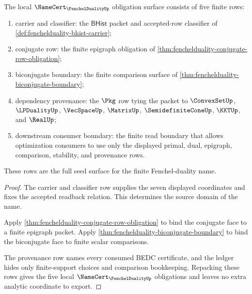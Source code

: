 \begin{theorem}
\label{thm:fenchelduality-certificate-obligation-surface}
The local $\NameCert_{\FenchelDualityUp}$ obligation surface consists of five finite rows:
\begin{enumerate}
\item carrier and classifier: the $\mathsf{BHist}$ packet and accepted-row classifier of \autoref{def:fenchelduality-bhist-carrier};
\item conjugate row: the finite epigraph obligation of \autoref{thm:fenchelduality-conjugate-row-obligation};
\item biconjugate boundary: the finite comparison surface of \autoref{thm:fenchelduality-biconjugate-boundary};
\item dependency provenance: the $\Pkg$ row tying the packet to $\ConvexSetUp$, $\LPDualityUp$, $\VecSpaceUp$, $\MatrixUp$, $\SemidefiniteConeUp$, $\KKTUp$, and $\RealUp$;
\item downstream consumer boundary: the finite read boundary that allows optimization consumers to use only the displayed primal, dual, epigraph, comparison, stability, and provenance rows.
\end{enumerate}
These rows are the full seed surface for the finite Fenchel-duality name.
\end{theorem}
\begin{proof}
The carrier and classifier row supplies the seven displayed coordinates and fixes the accepted readback relation. This determines the source domain of the name.

Apply \autoref{thm:fenchelduality-conjugate-row-obligation} to bind the conjugate face to a finite epigraph packet. Apply \autoref{thm:fenchelduality-biconjugate-boundary} to bind the biconjugate face to finite scalar comparisons.

The provenance row names every consumed BEDC certificate, and the ledger hides only finite-support choices and comparison bookkeeping. Repacking these rows gives the five local $\NameCert_{\FenchelDualityUp}$ obligations and leaves no extra analytic coordinate to export.
\end{proof}

